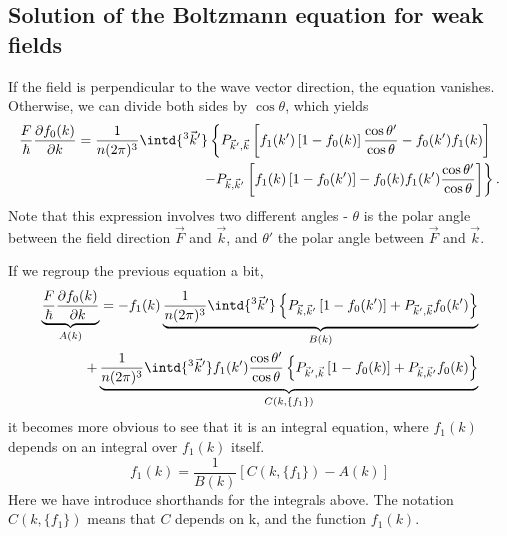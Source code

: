 \documentclass[physics,phd,nolot,nolof]{uccthesis}%
\begin{document}
{\subsection{Solution of the Boltzmann equation for weak fields}
If the field is perpendicular to the wave vector direction, the equation vanishes.
Otherwise, we can divide both sides by $\cos\theta$, which yields
\begin{equation}
  \begin{split}
\frac{F}{\hbar} 
  \frac{\partial f_0(k)}{\partial k}
  =\frac{1}{n(2\pi)^3} \intd{^3\vec k'}
  \left\{
  	 P_{\vec k',\vec k}
	 \left[ 
	 f_1(k')\left[1-f_0(k)\right]\frac{\cos\theta'}{\cos\theta}
	 	-f_0(k')f_1(k)
	\right]\;\; 
		\right.\\ \left.
  	-P_{\vec k,\vec k'}
	 \left[
		f_1(k)\left[1-f_0(k')\right]
		-f_0(k)f_1(k')\frac{\cos\theta'}{\cos\theta}
	\right] 
  \right\}.
  \end{split}
  \label{eq:Boltzmann-1b}
\end{equation}
Note that this expression involves two different angles - 
$\theta$ is the polar angle between the field direction $\vec F$ and $\vec k$, 
and $\theta'$ the polar angle between $\vec F$ and $\vec k$.

If we regroup the previous equation a bit, 
\begin{equation}
  \begin{split}
\underbrace{
	\frac{F}{\hbar} 
	\frac{\partial f_0(k)}{\partial k}
	}_{A(k)}
  =  -f_1(k)
\underbrace{
\frac{1}{n(2\pi)^3} \intd{^3\vec k'}
	  \left\{
  		P_{\vec k,\vec k'}
			\left[1-f_0(k')\right]
		 +P_{\vec k',\vec k} 
		 	f_0(k')
	  \right\}
	  }_{B(k)}
  \\+
\underbrace{
\frac{1}{n(2\pi)^3} \intd{^3\vec k'}
	  f_1(k')\frac{\cos\theta'}{\cos\theta}
	\left\{
  		  P_{\vec k',\vec k}
		  	\left[1-f_0(k)\right]
  		+P_{\vec k,\vec k'}
			f_0(k)		\right\}	 
			}_{C(k,\{f_1\})}
  \end{split}
  \label{eq:Boltzmann-1b}
\end{equation}
it becomes more obvious to see that it is an integral equation, where
$f_1(k)$ depends on an integral over $f_1(k)$ itself.
\begin{equation}
  f_1(k) = \frac{1}{B(k)}\left[ C(k, \{f_1\}) -A(k) \right]
  \label{eq:f1-integral}
\end{equation}
Here we have introduce shorthands for the integrals above. 
The notation $C(k,\{f_1\})$ means that $C$ depends on k, and the function $f_1(k)$.
}
\end{document}
